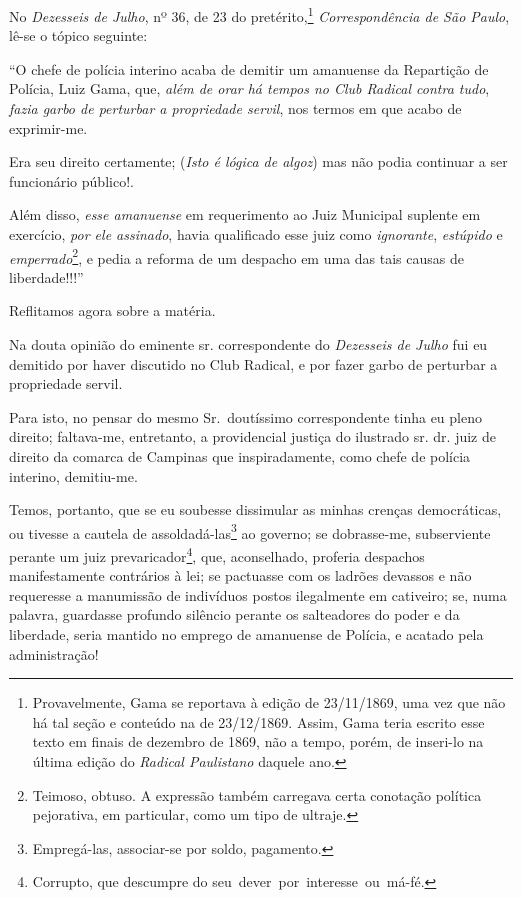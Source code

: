 No \emph{Dezesseis de Julho}, nº 36, de 23 do pretérito,\footnote{
  Provavelmente, Gama se reportava à edição de 23/11/1869, uma vez que
  não há tal seção e conteúdo na de 23/12/1869. Assim, Gama teria
  escrito esse texto em finais de dezembro de 1869, não a tempo, porém,
  de inseri-lo na última edição do \emph{Radical Paulistano} daquele
  ano.} \emph{Correspondência de São Paulo}, lê-se o tópico seguinte:

``O chefe de polícia interino acaba de demitir um amanuense da Repartição
de Polícia, Luiz Gama, que, \emph{além de orar há tempos no Club Radical
contra tudo}, \emph{fazia garbo de perturbar a propriedade servil}, nos
termos em que acabo de exprimir-me.

Era seu direito certamente; (\emph{Isto é lógica de algoz}) mas não
podia continuar a ser funcionário público!.

Além disso, \emph{esse amanuense} em requerimento ao Juiz Municipal
suplente em exercício, \emph{por ele assinado}, havia qualificado esse
juiz como \emph{ignorante}, \emph{estúpido} e
\emph{emperrado}\footnote{ Teimoso, obtuso. A expressão também
  carregava certa conotação política pejorativa, em particular, como um
  tipo de ultraje.}, e pedia a reforma de um despacho em uma das tais 
  causas de liberdade!!!''

Reflitamos agora sobre a matéria.

Na douta opinião do eminente sr. correspondente do \emph{Dezesseis de
Julho} fui eu demitido por haver discutido no Club Radical, e por fazer
garbo de perturbar a propriedade servil.

Para isto, no pensar do mesmo Sr.~doutíssimo correspondente tinha eu
pleno direito; faltava-me, entretanto, a providencial justiça do
ilustrado sr. dr. juiz de direito da comarca de Campinas que
inspiradamente, como chefe de polícia interino, demitiu-me.

Temos, portanto, que se eu soubesse dissimular as minhas crenças
democráticas, ou tivesse a cautela de assoldadá-las\footnote{
  Empregá-las, associar-se por soldo, pagamento.} ao governo; se
dobrasse-me, subserviente perante um juiz prevaricador\footnote{
  Corrupto, que descumpre do seu~dever~por~interesse~ou~má-fé.}, que,
aconselhado, proferia despachos manifestamente contrários à lei; se
pactuasse com os ladrões devassos e não requeresse a manumissão de
indivíduos postos ilegalmente em cativeiro; se, numa palavra, guardasse
profundo silêncio perante os salteadores do poder e da liberdade, seria
mantido no emprego de amanuense de Polícia, e acatado pela
administração!

